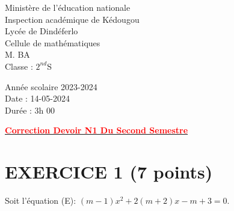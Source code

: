 \documentclass[12pt]{article}
\begin{document}
\begin{minipage}{0.5\textwidth}
	Ministère de l'éducation nationale  \\
	Inspection académique de Kédougou   \\
	Lycée de Dindéferlo            \\
	Cellule de mathématiques            \\
	M. BA                          \\
	Classe : $2^{nd}$S  \\
\end{minipage}
\begin{minipage}{0.5\textwidth}
	Année scolaire 2023-2024 \\
	Date : 14-05-2024 \\
	Durée : 3h 00 \\
\end{minipage}

\begin{center}
	\textbf{{\underline{\textcolor{red}{Correction Devoir N1 Du Second Semestre}}}}
\end{center}

\section*{EXERCICE 1 (7 points)}   
Soit l’équation (E): \((m -1)x^2 + 2(m + 2)x - m + 3 = 0\).
\end{document}
